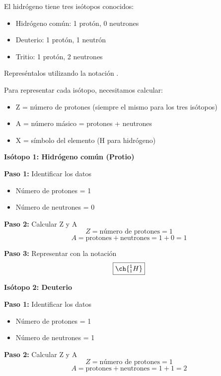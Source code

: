 \begin{exercise}
    El hidrógeno tiene tres isótopos conocidos:
    \begin{itemize}
        \item Hidrógeno común: 1 protón, 0 neutrones
        \item Deuterio: 1 protón, 1 neutrón
        \item Tritio: 1 protón, 2 neutrones
    \end{itemize}
    Represéntalos utilizando la notación .
    \begin{solu}
        Para representar cada isótopo, necesitamos calcular:
        \begin{itemize}
            \item Z = número de protones (siempre el mismo para los tres isótopos)
            \item A = número másico = protones + neutrones
            \item X = símbolo del elemento (H para hidrógeno)
        \end{itemize}

        \textbf{Isótopo 1: Hidrógeno común (Protio)}

        \textbf{Paso 1:} Identificar los datos
        \begin{itemize}
            \item Número de protones = 1
            \item Número de neutrones = 0
        \end{itemize}

        \textbf{Paso 2:} Calcular Z y A
        \[
            Z = \text{número de protones} = 1
        \]
        \[
            A = \text{protones} + \text{neutrones} = 1 + 0 = 1
        \]

        \textbf{Paso 3:} Representar con la notación
        \[
            \boxed{\ch{^{1}_{1}H}}
        \]

        \textbf{Isótopo 2: Deuterio}

        \textbf{Paso 1:} Identificar los datos
        \begin{itemize}
            \item Número de protones = 1
            \item Número de neutrones = 1
        \end{itemize}

        \textbf{Paso 2:} Calcular Z y A
        \[
            Z = \text{número de protones} = 1
        \]
        \[
            A = \text{protones} + \text{neutrones} = 1 + 1 = 2
        \]


\end{solu}
\end{exercise}
